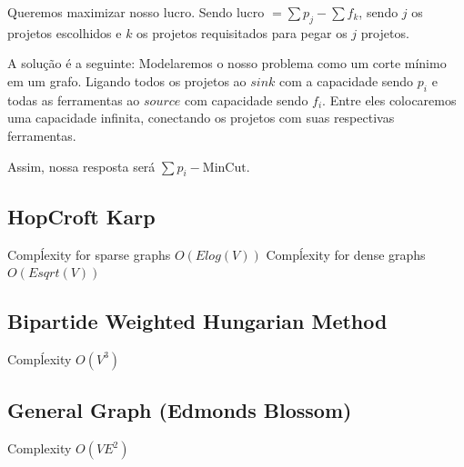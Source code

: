         Queremos maximizar nosso lucro. Sendo lucro $ = \sum p_j - \sum f_k$, sendo $j$ os projetos escolhidos e $k$ os projetos requisitados para pegar os $j$ projetos.

        A solução é a seguinte: Modelaremos o nosso problema como um corte mínimo em um grafo. Ligando todos os projetos ao $sink$ com a capacidade sendo $p_i$ e todas as ferramentas ao $source$ com capacidade sendo $f_i$. Entre eles colocaremos uma capacidade infinita, conectando os projetos com suas respectivas ferramentas.

        Assim, nossa resposta será $\sum p_i - \text{MinCut}$.
        
        \subsection {HopCroft Karp}
            Compĺexity for sparse graphs $O(E log(V))$
            Compĺexity for dense graphs $O(E sqrt(V))$
        \subsection{Bipartide Weighted Hungarian Method}
        Compĺexity $O(V^3)$
        \subsection{General Graph (Edmonds Blossom)}
        Complexity $O(VE^2)$

